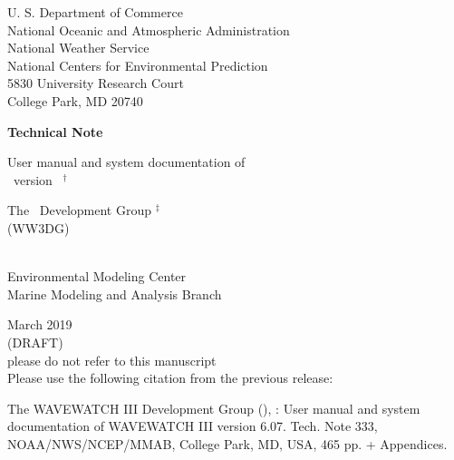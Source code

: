 
\pagestyle{empty}

\begin{center} 
U. S. Department of Commerce \\
National Oceanic and Atmospheric Administration \\
National Weather Service \\
National Centers for Environmental Prediction \\
5830 University Research Court \\
College Park, MD 20740


\vspace{15mm}

{\bf Technical Note}

\vspace{15mm}

{\large User manual and system documentation of \\
\ww\ version \WWver\ $^\dag$} \\

\vspace{15mm}

The \ww\ Development Group $^\ddag$ \\
(WW3DG)\\
\strut \\
Environmental Modeling Center \\
Marine Modeling and Analysis Branch

\vfill

 March 2019 \\
(DRAFT) \\
\vspace{\baselineskip}
{\sc please do not refer to this manuscript} \\
Please use the following citation from the previous release: 
\end{center}
\noindent The WAVEWATCH III\textsuperscript{\textregistered} Development Group (), \citeyearpar{ww3man2019}: User manual and system documentation of  WAVEWATCH III\textsuperscript{\textregistered} version 6.07. Tech. Note 333, NOAA/NWS/NCEP/MMAB, College Park, MD, USA, 465 pp. + Appendices. 

